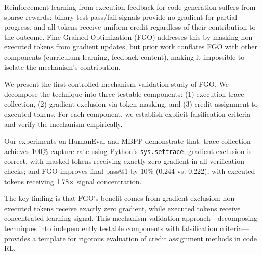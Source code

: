 Reinforcement learning from execution feedback for code generation suffers from sparse rewards: binary test pass/fail signals provide no gradient for partial progress, and all tokens receive uniform credit regardless of their contribution to the outcome. Fine-Grained Optimization (FGO) addresses this by masking non-executed tokens from gradient updates, but prior work conflates FGO with other components (curriculum learning, feedback content), making it impossible to isolate the mechanism's contribution.

We present the first controlled mechanism validation study of FGO. We decompose the technique into three testable components: (1) execution trace collection, (2) gradient exclusion via token masking, and (3) credit assignment to executed tokens. For each component, we establish explicit falsification criteria and verify the mechanism empirically.

Our experiments on HumanEval and MBPP demonstrate that: trace collection achieves 100\% capture rate using Python's \texttt{sys.settrace}; gradient exclusion is correct, with masked tokens receiving exactly zero gradient in all verification checks; and FGO improves final pass@1 by 10\% (0.244 vs. 0.222), with executed tokens receiving 1.78$\times$ signal concentration.

The key finding is that FGO's benefit comes from gradient exclusion: non-executed tokens receive exactly zero gradient, while executed tokens receive concentrated learning signal. This mechanism validation approach---decomposing techniques into independently testable components with falsification criteria---provides a template for rigorous evaluation of credit assignment methods in code RL.

